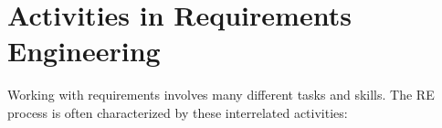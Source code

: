 \documentclass[a4paper,10pt,oneside]{book}
\begin{document}
\section{Activities in Requirements Engineering}


Working with requirements involves many different tasks and skills. The RE process is often characterized by these interrelated activities: 
\end{document}

